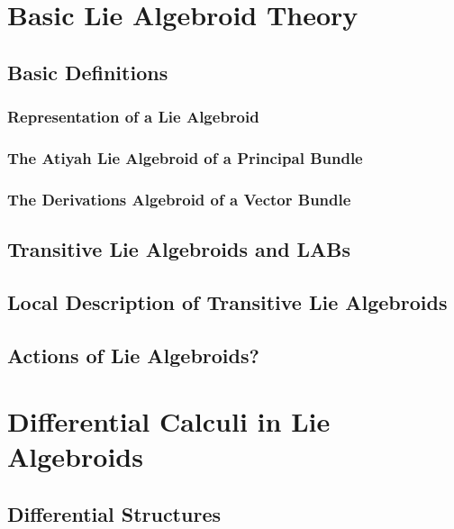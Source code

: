 \documentclass[12pt]{report}
\theoremstyle{definition}
\begin{document}
\chapter{Basic Lie Algebroid Theory}\label{chp:KMS}
\section{Basic Definitions}
\subsection{Representation of a Lie Algebroid}
\subsection{The Atiyah Lie Algebroid of a Principal Bundle}
\subsection{The Derivations Algebroid of a Vector Bundle}

\section{Transitive Lie Algebroids and LABs}

\section{Local Description of Transitive Lie Algebroids}

\section{Actions of Lie Algebroids?}



\chapter{Differential Calculi in Lie Algebroids}\label{chp:KMS}

\section{Differential Structures}
\end{document}
